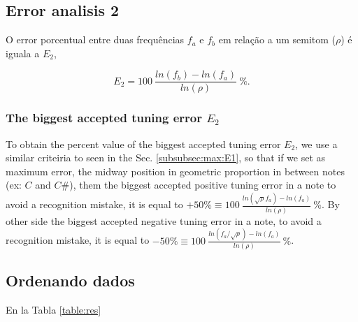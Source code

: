 \documentclass{article}
\begin{document}
\subsection{Error analisis 2}
O error porcentual entre duas frequências $f_a$ e $f_b$ em relação a um semitom ($\rho$) é
iguala a $E_2$,

\begin{equation}
E_2=100~\frac{ln(f_b)-ln(f_a)}{ln(\rho)}~\%.
\end{equation}

\subsubsection{The biggest accepted tuning error $E_2$}
\label{subsubsec:max:E2}
To obtain the percent value of the biggest accepted tuning error $E_2$,
we use a similar criteiria to seen in the Sec. \ref{subsubsec:max:E1},
so that 
if we set as maximum error, the midway position in geometric proportion in between notes (ex: $C$ and $C\#$), them 
the biggest accepted positive tuning error in a note  
to avoid a recognition mistake, it is equal to $+50\% \equiv 100~\frac{ln(\sqrt{\rho} f_a)-ln(f_a)}{ln(\rho)}~\%  $.
By other side 
the biggest accepted negative tuning error in a note, 
to avoid a recognition mistake, it is equal to $-50\% \equiv 100~\frac{ln( f_a/\sqrt{\rho})-ln(f_a)}{ln(\rho)}~\%  $.


\subsection{Ordenando dados}

En la Tabla \ref{table:res}
\end{document}

